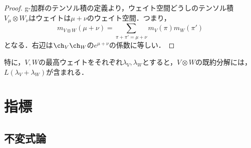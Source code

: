 \documentclass[rep_main]{subfiles}
\begin{document}
\begin{proof}
	g-加群のテンソル積の定義より，ウェイト空間どうしのテンソル積$V_\mu \otimes W_\nu$はウェイトは$\mu + \nu$のウェイト空間．つまり，
	\begin{equation}
		m_{V \otimes W}(\mu + \nu) = \sum_{\pi + \pi' = \mu + \nu} m_V(\pi)m_W(\pi')
	\end{equation}
	となる．右辺は$\ch_V\ch_W$の$e^{\mu + \nu}$の係数に等しい．
\end{proof}
特に，$V, W$の最高ウェイトをそれぞれ$\lambda_V, \lambda_W$とすると，$V \otimes W$の既約分解には，$L(\lambda_V + \lambda_W)$が含まれる．

\section{指標}



\subsection{不変式論}
\end{document}
